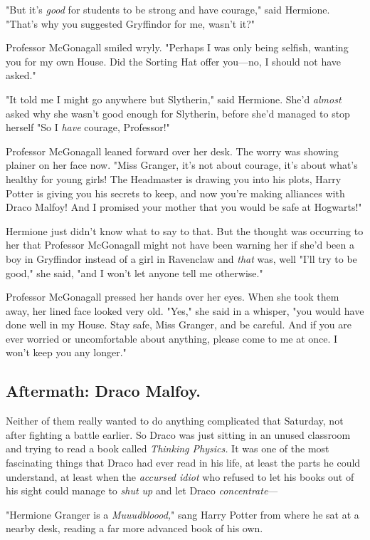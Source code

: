 "But it's \emph{good} for students to be strong and have courage," said
Hermione. "That's why you suggested Gryffindor for me, wasn't it?"

Professor McGonagall smiled wryly. "Perhaps I was only being selfish, wanting
you for my own House. Did the Sorting Hat offer you—no, I should not have
asked."

"It told me I might go anywhere but Slytherin," said Hermione. She'd
\emph{almost} asked why she wasn't good enough for Slytherin, before she'd
managed to stop herself{\el} "So I \emph{have} courage, Professor!"

Professor McGonagall leaned forward over her desk. The worry was showing
plainer on her face now. "Miss Granger, it's not about courage, it's about
what's healthy for young girls! The Headmaster is drawing you into his plots,
Harry Potter is giving you his secrets to keep, and now you're making alliances
with Draco Malfoy! And I promised your mother that you would be safe at
Hogwarts!"

Hermione just didn't know what to say to that. But the thought was occurring to
her that Professor McGonagall might not have been warning her if she'd been a
boy in Gryffindor instead of a girl in Ravenclaw and \emph{that} was,
well{\el} "I'll try to be good," she said, "and I won't let anyone tell me
otherwise."

Professor McGonagall pressed her hands over her eyes. When she took them away,
her lined face looked very old. "Yes," she said in a whisper, "you would have
done well in my House. Stay safe, Miss Granger, and be careful. And if you are
ever worried or uncomfortable about anything, please come to me at once. I
won't keep you any longer."
\sbreak
\vspace{-2\baselineskip}
\subsection{Aftermath: Draco Malfoy.}

Neither of them really wanted to do anything complicated that Saturday, not
after fighting a battle earlier. So Draco was just sitting in an unused
classroom and trying to read a book called \emph{Thinking Physics.} It was one
of the most fascinating things that Draco had ever read in his life, at least
the parts he could understand, at least when the \emph{accursed idiot} who
refused to let his books out of his sight could manage to \emph{shut up} and
let Draco \emph{concentrate}—

"Hermione Granger is a \emph{Muuudbloood,}" sang Harry Potter from where he sat
at a nearby desk, reading a far more advanced book of his own.

